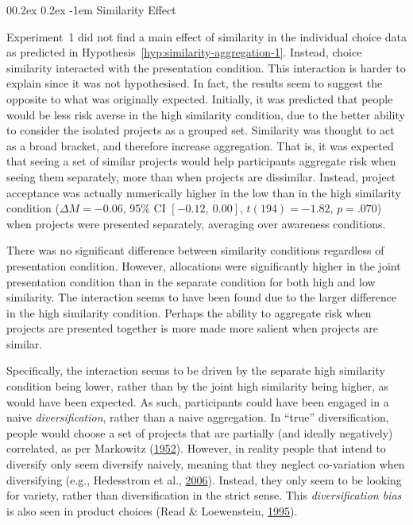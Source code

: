 \documentclass[
  english,
  man, donotrepeattitle,floatsintext]{apa7}
\makeatletter
\let\oldparagraph\paragraph
\renewcommand{\paragraph}[1]{\oldparagraph{#1}\mbox{}}
\renewcommand{\paragraph}{\@startsection{paragraph}{4}{\parindent}%
  {0\baselineskip \@plus 0.2ex \@minus 0.2ex}%
  {-1em}%
  {\normalfont\normalsize\bfseries\itshape\typesectitle}}
\theoremstyle{definition}
\theoremstyle{definition}
\theoremstyle{definition}
\theoremstyle{definition}
\theoremstyle{remark}
\makeatother
\begin{document}
\hypertarget{similarity-discussion-aggregation-1}{%
\paragraph{Similarity Effect}\label{similarity-discussion-aggregation-1}}

Experiment~1 did not find a main effect of similarity in the individual choice
data as predicted in Hypothesis~\ref{hyp:similarity-aggregation-1}. Instead,
choice similarity interacted with the presentation condition. This interaction
is harder to explain since it was not hypothesised. In fact, the results seem to
suggest the opposite to what was originally expected. Initially, it was
predicted that people would be less risk averse in the high similarity
condition, due to the better ability to consider the isolated projects as a
grouped set. Similarity was thought to act as a broad bracket, and therefore
increase aggregation. That is, it was expected that seeing a set of similar
projects would help participants aggregate risk when seeing them separately,
more than when projects are dissimilar. Instead, project acceptance was actually
numerically higher in the low than in the high similarity condition
(\(\Delta M = -0.06\), 95\% CI \([-0.12,~0.00]\), \(t(194) = -1.82\), \(p = .070\)) when projects were
presented separately, averaging over awareness conditions.

There was no significant difference between similarity conditions regardless of
presentation condition. However, allocations were significantly higher in the
joint presentation condition than in the separate condition for both high and
low similarity. The interaction seems to have been found due to the larger
difference in the high similarity condition. Perhaps the ability to aggregate
risk when projects are presented together is more made more salient when
projects are similar.

Specifically, the interaction seems to be driven by the separate high similarity
condition being lower, rather than by the joint high similarity being higher, as
would have been expected. As such, participants could have been engaged in a
naive \emph{diversification}, rather than a naive aggregation. In ``true''
diversification, people would choose a set of projects that are partially (and
ideally negatively) correlated, as per Markowitz (\protect\hyperlink{ref-markowitz1952}{1952}). However, in reality
people that intend to diversify only seem diversify naively, meaning that they
neglect co-variation when diversifying (e.g., Hedesstrom et al., \protect\hyperlink{ref-hedesstrom2006}{2006}). Instead, they
only seem to be looking for variety, rather than diversification in the strict
sense. This \emph{diversification bias} is also seen in product choices (Read \& Loewenstein, \protect\hyperlink{ref-read1995}{1995}).
\end{document}
